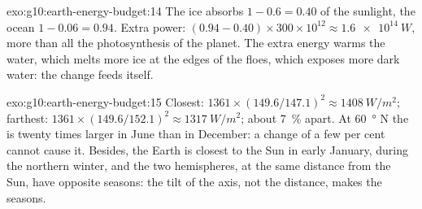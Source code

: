 \begin{solution}{exo:g10:earth-energy-budget:14}
The ice absorbs $1 - 0.6 = 0.40$ of the sunlight, the ocean $1 - 0.06 =
0.94$. Extra power: $(0.94 - 0.40) \times 300 \times 10^{12} \approx
\qty{1.6e14}{W}$, more than all the photosynthesis of the planet. The extra
energy warms the water, which melts more ice at the edges of the floes,
which exposes more dark water: the change feeds itself.
\end{solution}

\begin{solution}{exo:g10:earth-energy-budget:15}
Closest: $1361 \times (149.6/147.1)^2 \approx \qty{1408}{W/m^2}$; farthest:
$1361 \times (149.6/152.1)^2 \approx \qty{1317}{W/m^2}$; about
\qty{7}{\percent} apart. At \qty{60}{\degree} N the  is twenty
times larger in June than in December: a change of a few per cent cannot
cause it. Besides, the Earth is closest to the Sun in early January, during
the northern winter, and the two hemispheres, at the same distance from the
Sun, have opposite seasons: the tilt of the axis, not the distance, makes
the seasons.
\end{solution}

